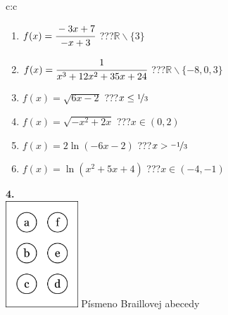 \documentclass[10pt]{report}
\begin{document}
\begin{tabular}{c:c}
\begin{minipage}[c][104.5mm][t]{0.5\linewidth}
\begin{center}
\begin{minipage}{0.79\linewidth}
\begin{center}
\begin{varwidth}{\linewidth}
\begin{enumerate}
\normalsizerrr
\item $f(x)=\cfrac{-3x+7}{-x+3}$\quad \dotfill\; ???\;\dotfill \quad $\mathbb{R}\smallsetminus\{3\}$
\item $f(x)=\cfrac{1}{x^3+12x^2+35x+24}$\quad \dotfill\; ???\;\dotfill \quad $\mathbb{R}\smallsetminus\{-8,0,3\}$
\item $f(x)=\sqrt{6x-2}$\quad \dotfill\; ???\;\dotfill \quad $x\leq\nicefrac{1}{3}$
\item $f(x)=\sqrt{-x^2+2x}$\quad \dotfill\; ???\;\dotfill \quad $x\in(0 , 2)$
\item $f(x)=2\ln{(-6x-2)}$\quad \dotfill\; ???\;\dotfill \quad $x>\nicefrac{-1}{3}$
\item $f(x)=\ln{(x^2+5x+4)}$\quad \dotfill\; ???\;\dotfill \quad $x\in(-4 , -1)$
\end{enumerate}
\end{varwidth}
\end{center}
\end{minipage}
\begin{minipage}{0.20\linewidth}
\begin{center}
{\Huge\bfseries 4.} \\[2mm]
\includegraphics[height=40mm]{../images/braille.png}
{\small Písmeno Braillovej abecedy}
\end{center}
\end{minipage}
\end{center}
\end{minipage}
%
\end{tabular}
\newpage
\thispagestyle{empty}
\end{document}
